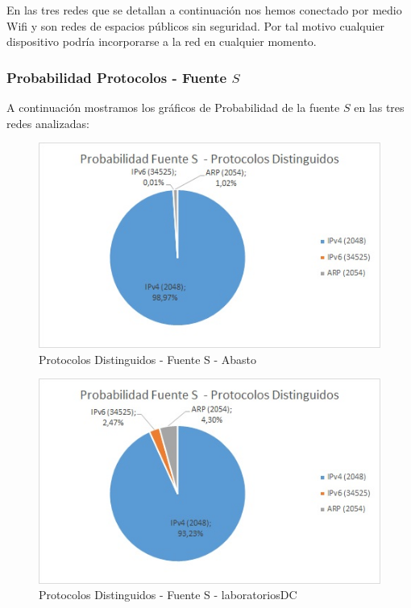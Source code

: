 En las tres redes que se detallan a continuación nos hemos conectado por medio Wifi y son redes de espacios públicos sin seguridad. 
Por tal motivo cualquier dispositivo podría incorporarse a la red en cualquier momento.\\

\subsubsection{Probabilidad Protocolos - Fuente $S$}
A continuación mostramos los gráficos de Probabilidad de la fuente $S$ en las tres redes analizadas:

\begin{figure}[h!]
\centering
\includegraphics[scale=0.7]{./img/probaS_abasto.jpg}
\caption{Protocolos Distinguidos - Fuente S - Abasto}
\end{figure}

\begin{figure}[h!]
\centering
\includegraphics[scale=0.7]{./img/probaS_laboDC.jpg}
\caption{Protocolos Distinguidos - Fuente S - laboratoriosDC}
\end{figure}
\newpage

